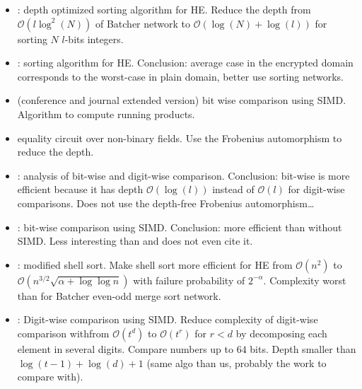\begin{itemize}
\item \cite{CDSS15}: depth optimized sorting algorithm for HE. Reduce the depth from $\mathcal{O}(l\log^2(N))$ of Batcher network to $\mathcal{O}(\log(N) + \log(l))$ for sorting $N$ $l$-bits integers.

\item \cite{EGNS15}: sorting algorithm for HE. Conclusion: average case in the encrypted domain corresponds to the worst-case in plain domain, better use sorting networks.

\item \cite{CKK15,CKK16} (conference and journal extended version) bit wise comparison using SIMD. Algorithm to compute running products.

\item \cite{KLLW18} equality circuit over non-binary fields. Use the Frobenius automorphism to reduce the depth. 
  
\item \cite{NGEG17}: analysis of bit-wise and digit-wise comparison. Conclusion: bit-wise is more efficient because it has depth $\mathcal{O}(\log(l))$ instead of $\mathcal{O}(l)$ for digit-wise comparisons. Does not use the depth-free Frobenius automorphism\dots

\item \cite{JS19}: bit-wise comparison using SIMD. Conclusion: more efficient than without SIMD. Less interesting than \cite{CKK15} and does not even cite it.
 
\item \cite{LKN19}: modified shell sort. Make shell sort more efficient for HE from $\mathcal{O}(n^2)$ to $\mathcal{O}(n^{3/2}\sqrt{\alpha+\log\log n})$ with failure probability of $2^{-\alpha}$. Complexity worst than for Batcher even-odd merge sort network.

\item \cite{TLWRK20}: Digit-wise comparison using SIMD. Reduce complexity of digit-wise comparison withfrom $\mathcal{O}(t^{d})$ to $\mathcal{O}(t^{r})$ for $r < d$ by decomposing each element in several digits. Compare numbers up to $64$ bits. Depth smaller than $\log(t-1) + \log(d) + 1$ (same algo than us, probably the work to compare with).
\end{itemize}
  

